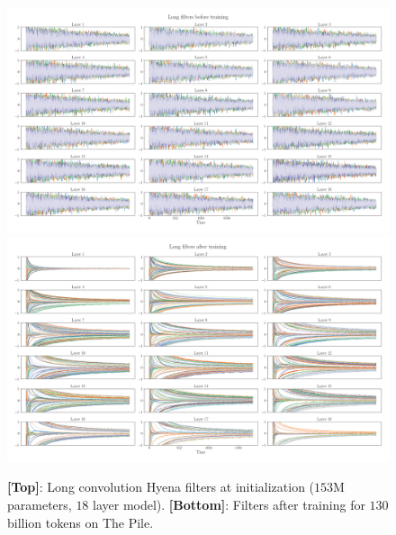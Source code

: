  
\begin{figure}
    \centering
    \includegraphics[width=0.99\linewidth]{figures/long_filters_init.png}
    \vspace{2mm}
    \includegraphics[width=0.99\linewidth]{figures/long_filters.png}
    \caption{\textbf{[Top]}: Long convolution {\sf Hyena} filters at initialization ($153$M parameters, $18$ layer model). \textbf{[Bottom]}: Filters after training for $130$ billion tokens on {\sc The Pile}.}
    \label{fig:hyena_filters}
\end{figure}

